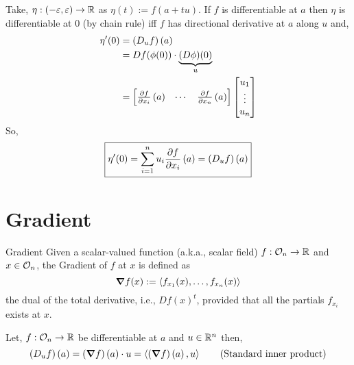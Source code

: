 \documentclass[../Analysis-3.tex]{subfiles}
\begin{document}
Take, $ \eta : \left( -\varepsilon, \varepsilon \right) \to \mathbb{R} $ as $ \eta(t) := f(a+tu) $. If $ f $ is differentiable at $ a $ then $ \eta $ is differentiable at 0 (by chain rule) iff $f$ has directional derivative at $ a $ along $ u $ and,
\begin{align*}
  \eta'(0) & = \left( D_uf \right)\left( a \right)                                 \\
           & = Df(\phi(0))\cdot \underbrace{(D\phi)(0)}_{u}                        \\
           & = \begin{bmatrix}
                 \pdv{f}{x_i}\left( a \right) & \cdots & \pdv{f}{x_n}\left( a \right)
               \end{bmatrix}\begin{bmatrix}
                              u_1 \\ \vdots \\ u_n \end{bmatrix}
\end{align*}
So,
\[
  \boxed{\eta'(0) = \sum_{i=1}^{n}u_i\pdv{f}{x_i} \left( a \right) = \left( D_uf \right)\left( a \right)}
\]



\section{Gradient}

\begin{Def}{Gradient}{}
  Given a scalar-valued function (a.k.a., scalar field) $ f:\mathcal{O}_{n}\to\mathbb{R} $ and $ x\in\mathcal{O}_{n} $, the Gradient of $ f $ at $ x $ is defined as
  \[
    \grad f(x) := \left\langle f_{x_1}(x), \ldots, f_{x_n}(x) \right\rangle
  \]
  the dual of the total derivative, i.e., $ Df(x)^t $, provided that all the partials $ f_{x_i} $ exists at $ x $.
\end{Def}

\begin{noteBox}
  Let, $ f:\mathcal{O}_{n}\to\mathbb{R} $ be differentiable at $ a $ and $ u\in\mathbb{R}^n $ then,
  \[
    \left( D_uf \right)(a) = \left( \grad f\right)\left( a \right)\cdot u  = \left\langle \left( \grad f \right)\left( a \right), u \right\rangle  \tag{Standard inner product}
  \]
\end{noteBox}
\end{document}
